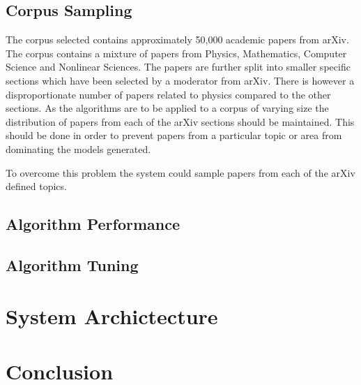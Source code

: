 \subsection{Corpus Sampling}
The corpus selected contains approximately 50,000 academic papers from arXiv.
The corpus contains a mixture of papers from Physics, Mathematics, Computer Science and Nonlinear Sciences.
The papers are further split into smaller specific sections which have been selected by a moderator from arXiv.
There is however a disproportionate number of papers related to physics compared to the other sections.
As the algorithms are to be applied to a corpus of varying size the distribution of papers from each of the arXiv sections should be maintained.
This should be done in order to prevent papers from a particular topic or area from dominating the models generated.

To overcome this problem the system could sample papers from each of the arXiv defined topics.

\subsection{Algorithm Performance}

\subsection{Algorithm Tuning}

\section{System Archictecture}
\section{Conclusion}

